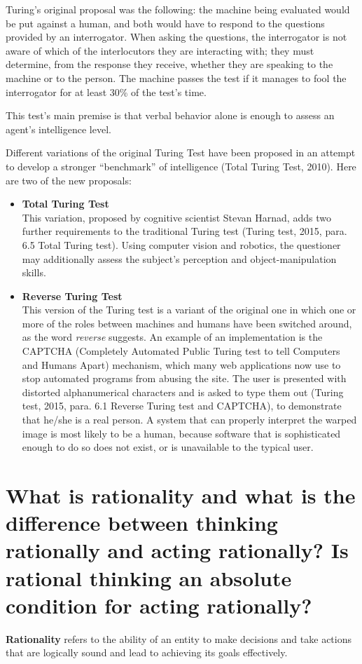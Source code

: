 \documentclass{article}
\begin{document}
Turing's original proposal was the following: the machine being evaluated would be put against a human, and both would have to respond to the questions provided by an interrogator.
When asking the questions, the interrogator is not aware of which of the interlocutors they are interacting with; they must determine, from the response they receive, whether they are speaking to the machine or to the person.
The machine passes the test if it manages to fool the interrogator for at least 30\% of the test’s time.

This test's main premise is that verbal behavior alone is enough to assess an agent's intelligence level.

Different variations of the original Turing Test have been proposed in an attempt to develop a stronger “benchmark” of intelligence (Total Turing Test, 2010).
Here are two of the new proposals:
\begin{itemize}
    \item {\textbf{Total Turing Test}} \\
    This variation, proposed by cognitive scientist Stevan Harnad, adds two further requirements to the traditional Turing test (Turing test, 2015, para. 6.5 Total Turing test).
    Using computer vision and robotics, the questioner may additionally assess the subject's perception and object-manipulation skills.
    \item {\textbf{Reverse Turing Test}} \\
    This version of the Turing test is a variant of the original one in which one or more of the roles between machines and humans have been switched around, as the word \emph{reverse} suggests.
    An example of an implementation is the CAPTCHA (Completely Automated Public Turing test to tell Computers and Humans Apart) mechanism, which many web applications now use to stop automated programs from abusing the site.
    The user is presented with distorted alphanumerical characters and is asked to type them out (Turing test, 2015, para. 6.1 Reverse Turing test and CAPTCHA), to demonstrate that he/she is a real person.
    A system that can properly interpret the warped image is most likely to be a human, because software that is sophisticated enough to do so does not exist, or is unavailable to the typical user.
\end{itemize}


\section{What is rationality and what is the difference between thinking rationally and acting rationally?
Is rational thinking an absolute condition for acting rationally?}
\textbf{Rationality} refers to the ability of an entity to make decisions and take actions that are logically sound and lead to achieving its goals effectively.
\end{document}
